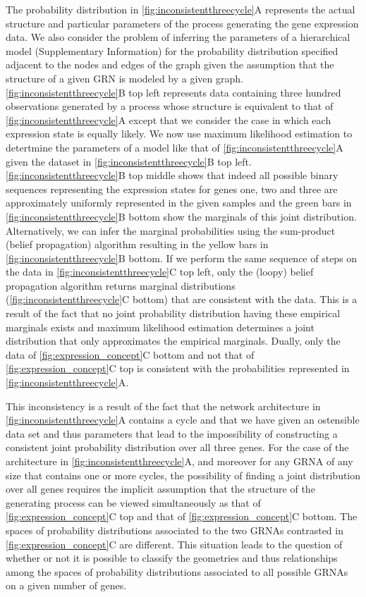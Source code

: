 The probability distribution in \ref{fig:inconsistentthreecycle}A represents the actual structure and particular parameters of the process generating the gene expression data. We also consider the problem of inferring the parameters of a hierarchical model (Supplementary Information) for the probability distribution specified adjacent to the nodes and edges of the graph given the assumption that the structure of a given GRN is modeled by a given graph. \ref{fig:inconsistentthreecycle}B top left represents data containing three hundred observations generated by a process whose structure is equivalent to that of \ref{fig:inconsistentthreecycle}A except that we consider the case in which each expression state is equally likely. We now use maximum likelihood estimation \cite{Barber2012} to detertmine the parameters of a model like that of \ref{fig:inconsistentthreecycle}A given the dataset in \ref{fig:inconsistentthreecycle}B top left. \ref{fig:inconsistentthreecycle}B top middle shows that indeed all possible binary sequences representing the expression states for genes one, two and three are approximately uniformly represented in the given samples and the green bars in \ref{fig:inconsistentthreecycle}B bottom show the marginals of this joint distribution. Alternatively, we can infer the marginal probabilities using the sum-product (belief propagation) algorithm \cite{Barber2012} resulting in the yellow bars in \ref{fig:inconsistentthreecycle}B bottom. If we perform the same sequence of steps on the data in \ref{fig:inconsistentthreecycle}C top left, only the (loopy) belief propagation algorithm returns marginal distributions (\ref{fig:inconsistentthreecycle}C bottom) that are consistent with the data. This is a result of the fact that no joint probability distribution having these empirical marginals exists and maximum likelihood estimation determines a joint distribution that only approximates the empirical marginals. Dually, only the data of \ref{fig:expression_concept}C bottom and not that of \ref{fig:expression_concept}C top is consistent with the probabilities represented in \ref{fig:inconsistentthreecycle}A.

This inconsistency is a result of the fact that the network architecture in \ref{fig:inconsistentthreecycle}A contains a cycle \cite{Lauritzen1996,Geiger2006,Wainwright2007} and that we have given an ostensible data set and thus parameters that lead to the impossibility of constructing a consistent joint probability distribution over all three genes. For the case of the architecture in \ref{fig:inconsistentthreecycle}A, and moreover for any GRNA of any size that contains one or more cycles, the possibility of finding a joint distribution over all genes requires the implicit assumption that the structure of the generating process can be viewed simultaneously as that of \ref{fig:expression_concept}C top and that of \ref{fig:expression_concept}C bottom. The spaces of probability distributions associated to the two GRNAs contrasted in \ref{fig:expression_concept}C are different. This situation leads to the question of whether or not it is possible to classify the geometries and thus relationships among the spaces of probability distributions associated to all possible GRNAs on a given number of genes.


